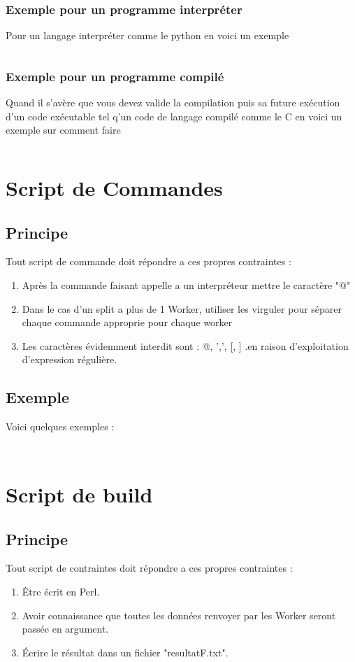 \documentclass[11pt]{report}
\begin{document}
\subsubsection{Exemple pour un programme interpréter}
Pour un langage interpréter comme le python en voici un exemple
\inputminted{perl}{../Echantillon_Script_Perl/nqueen.pl}
\subsubsection{Exemple pour un programme compilé }
Quand il s'avère que vous devez valide la compilation puis sa future exécution d'un code exécutable tel q'un code de langage compilé comme le C en voici un exemple sur comment faire 
\inputminted{perl}{../Echantillon_Script_Perl/langford.pl}
\section{Script de Commandes}
\subsection{Principe}
Tout script de commande doit répondre a ces propres contraintes :
\begin{enumerate}
\item Après la commande faisant appelle a un interpréteur mettre le caractère "@"
\item Dans le cas d'un split a plus de 1 Worker, utiliser les virguler pour séparer chaque commande approprie pour chaque worker
\item Les caractères évidemment interdit sont : @, ',', [, ] .en raison d'exploitation d'expression régulière.
\end{enumerate}
\subsection{Exemple}
Voici quelques exemples :
\inputminted{perl}{../Echantillon_Script_Cmd/nQuenn14.dc}
\inputminted{perl}{../Echantillon_Script_Cmd/Toto.dc}
\section{Script de build}
\subsection{Principe}
Tout script de contraintes doit répondre a ces propres contraintes :
\begin{enumerate}
\item Être écrit en Perl.
\item Avoir connaissance que toutes les données renvoyer par les Worker seront passée en argument.
\item Écrire le résultat dans un fichier "resultatF.txt".
\end{enumerate}
\end{document}
